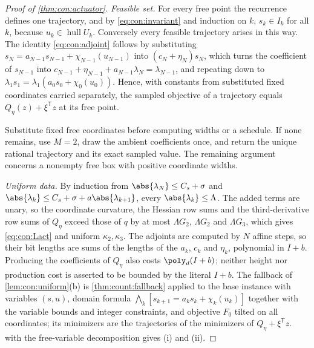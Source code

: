 \begin{proof}[Proof of \cref{thm:con:actuator}]
\emph{Feasible set.} For every free point the recurrence defines one
trajectory, and by \eqref{eq:con:invariant} and induction on $k$,
$s_k\in I_k$ for all $k$, because $u_k\in\operatorname{hull}U_k$. Conversely
every feasible trajectory arises in this way. The identity
\eqref{eq:con:adjoint} follows by substituting $s_N=a_{N-1}s_{N-1}+\chi_{N-1}(u_{N-1})$
into $(c_N+\eta_N)s_N$, which turns the coefficient of $s_{N-1}$ into
$c_{N-1}+\eta_{N-1}+a_{N-1}\lambda_N=\lambda_{N-1}$, and repeating down to
$\lambda_1s_1=\lambda_1(a_0s_0+\chi_0(u_0))$. Hence, with constants from
substituted fixed coordinates carried separately, the sampled objective of a
trajectory equals $Q_\eta(z)+\xi^{\mathsf T}z$ at its free point.

Substitute fixed free coordinates before computing widths or a schedule.
If none remains, use $M=2$, draw the ambient coefficients once, and return
the unique rational trajectory and its exact sampled value. The remaining
argument concerns a nonempty free box with positive coordinate widths.

\emph{Uniform data.} By induction from $\abs{\lambda_N}\le C_s+\sigma$ and
$\abs{\lambda_k}\le C_s+\sigma+a\abs{\lambda_{k+1}}$, every
$\abs{\lambda_k}\le\Lambda$. The added terms are unary, so the coordinate
curvature, the Hessian row sums and the third-derivative row sums of
$Q_\eta$ exceed those of $q$ by at most $\Lambda G_2$, $\Lambda G_2$ and
$\Lambda G_3$, which gives \eqref{eq:con:Lact} and uniform $\kappa_2,\kappa_3$.
The adjoints are computed by $N$ affine steps, so their bit lengths are sums
of the lengths of the $a_k$, $c_k$ and $\eta_k$, polynomial in $I+b$.
Producing the coefficients of $Q_\eta$ also costs $\poly_d(I+b)$; neither
height nor production cost is asserted to be bounded by the literal $I+b$. The
fallback of \cref{lem:con:uniform}(b) is \cref{thm:count:fallback} applied to
the base instance with variables $(s,u)$, domain formula
$\bigwedge_k[s_{k+1}=a_ks_k+\chi_k(u_k)]$ together with the variable bounds and
integer constraints, and objective $F_0$ tilted on all coordinates; its
minimizers are the trajectories of the minimizers of $Q_\eta+\xi^{\mathsf
T}z$.  with the free-variable decomposition gives (i)
and (ii).


\end{proof}
